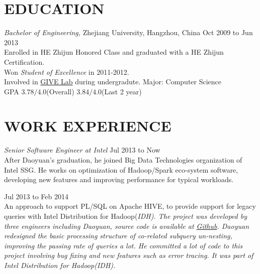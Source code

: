 \documentclass[line,margin]{res}
\begin{document}
\address{Cellphone:\sl +86-152-1686-1267}
\address{E-mail:\sl me at daoyuan.wang}


\begin{resume}

\section{EDUCATION} {\sl Bachelor of Engineering,} Zhejiang University, Hangzhou, China \hfill Oct 2009 to Jun 2013\\
                Enrolled in HE Zhijun Honored Class and graduated with a HE Zhijun Certification.\\
                Won {\sl Student of Excellence} in 2011-2012.\\
                Involved in \href{http://give.zju.edu.cn/en/portal/index.html}{GIVE Lab} during undergradute.
                Major: Computer Science \\
                GPA $3.78/4.0$(Overall) $3.84/4.0$(Last 2 year)

\section{WORK EXPERIENCE}
    {\sl Senior Software Engineer at Intel} \hfill         Jul 2013 to Now\\
    After Daoyuan's graduation, he joined Big Data Technologies organization of Intel SSG. He works on optimization of Hadoop/Spark eco-system software, developing new features and improving performance for typical workloads.
        \begin{outline}
             \hfill        Jul 2013 to Feb 2014\\
                An approach to support PL/SQL on Apache HIVE, to provide support for legacy queries with Intel Distribution for Hadoop(\sl IDH). The project was developed by three engineers including Daoyuan, source code is available at \href{https://github.com/intel-hadoop/project-panthera}{Github}. Daoyuan redesigned the basic processing structure of co-related subquery un-nesting, improving the passing rate of queries a lot. He committed a lot of code to this project involving bug fixing and new features such as error tracing. It was part of Intel Distribution for Hadoop(\sl IDH).


\end{outline}
\end{resume}
\end{document}
